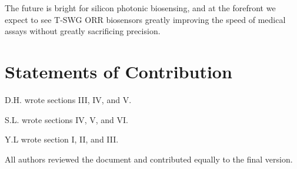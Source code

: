 \documentclass[aps,prl,twocolumn, superscriptaddress,nobalancelastpage]{revtex4}
\begin{document}
The future is bright for silicon photonic biosensing, and at the forefront we expect to see T-SWG ORR biosensors greatly improving the speed of medical assays without greatly sacrificing precision.











\section{Statements of Contribution}
\noindent D.H. wrote sections III, IV, and V.

\noindent S.L. wrote sections IV, V, and VI.

\noindent Y.L wrote section I, II, and III.

\noindent All authors reviewed the document and contributed equally to the final version.
\vspace{-1em}
\end{document}
